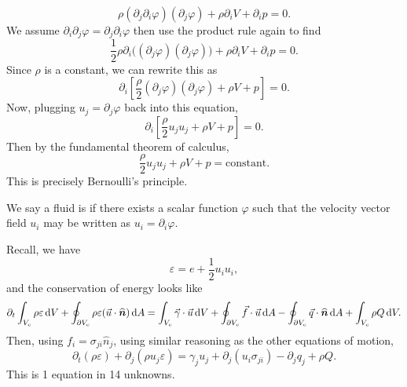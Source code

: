 \begin{example}
\begin{equation}
\rho(\partial_{j}\partial_{i}\varphi)(\partial_{j}\varphi)+\rho\partial_{i}V+\partial_{i}p=0.
\end{equation}
We assume
$\partial_{i}\partial_{j}\varphi=\partial_{j}\partial_{i}\varphi$ then
use the product rule again to find
\begin{equation}
\frac{1}{2}\rho\partial_{i}\bigr((\partial_{j}\varphi)(\partial_{j}\varphi)\bigr)+\rho\partial_{i}V+\partial_{i}p=0.
\end{equation}
Since $\rho$ is a constant, we can rewrite this as
\begin{equation}
\partial_{i}\left[\frac{\rho}{2}(\partial_{j}\varphi)(\partial_{j}\varphi)+\rho V+p\right]=0.
\end{equation}
Now, plugging $u_{j}=\partial_{j}\varphi$ back into this equation,
\begin{equation}
\partial_{i}\left[\frac{\rho}{2}u_{j}u_{j}+\rho V+p\right]=0.
\end{equation}
Then by the fundamental theorem of calculus,
\begin{equation}
\frac{\rho}{2}u_{j}u_{j}+\rho V+p=\mbox{constant}.
\end{equation}
This is precisely Bernoulli's principle.
\end{example}

\begin{definition}
We say a fluid is  if there exists a scalar
function $\varphi$ such that the velocity vector field $u_{i}$ may be
written as $u_{i}=\partial_{i}\varphi$.
\end{definition}

\begin{node}
Recall, we have
\begin{equation}
\varepsilon=e+\frac{1}{2}u_{i}u_{i},
\end{equation}
and the conservation of energy looks like
\begin{equation*}
\partial_{t}\int_{V_{c}}\rho\varepsilon\,\mathrm{d} V
+\oint_{\partial V_{c}}\rho\varepsilon(\vec{u}\cdot\widehat{\boldsymbol{n}})\,\mathrm{d} A
=\int_{V_{c}}\vec{\gamma}\cdot\vec{u}\,\mathrm{d} V
+\oint_{\partial V_{c}}\vec{f}\cdot\vec{u}\,\mathrm{d} A
-\oint_{\partial V_{c}}\vec{q}\cdot\widehat{\boldsymbol{n}}\,\mathrm{d} A
+\int_{V_{c}}\rho Q\,\mathrm{d} V.
\end{equation*}
Then, using $f_{i}=\sigma_{ji}\widehat{n}_{j}$, using similar
reasoning as the other equations of motion,
\begin{equation}
\partial_{t}(\rho\varepsilon)+\partial_{j}(\rho u_{j}\varepsilon)
=\gamma_{j}u_{j}+\partial_{j}(u_{i}\sigma_{ji})-\partial_{j}q_{j}+\rho Q.
\end{equation}
This is 1 equation in 14 unknowns.
\end{node}

